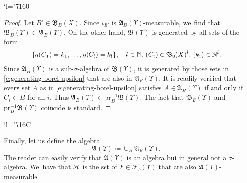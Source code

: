 \documentclass[JEP,XML,SOM,Unicode,published]{cedram}
\newcommand{\Changel}{\mathcode`l="7160}
\newcommand{\Changelback}{\mathcode`l="716C}
\theoremstyle{definition}
\theoremstyle{remark}
\DeclarePairedDelimiter{\set}{\lbrace}{\rbrace}
\begin{document}
\Changel
\begin{proof}
Let $B' \in \mathfrak{B}_{B}(X)$.
Since $\iota_{B'}$ is $\mathfrak{A}_{B}(\varUpsilon)$-measurable, we~find that $\mathfrak{B}_{B}(\varUpsilon) \subset \mathfrak{A}_{B}(\varUpsilon)$.
On the other hand, $\mathfrak{B}(\varUpsilon)$ is generated by all sets of the form
\begin{equation}\label{e:generating-borel-upsilon}
\set{ \eta(C_{1}) = k_{1}, \dotsc, \eta(C_{l}) = k_{l} }, \quad l \in \mathbb{N},\, (C_{i}) \in \mathfrak{B}_{0}(X)^{l},\, (k_{i}) \in \mathbb{N}^{l}.
\end{equation}
Since $\mathfrak{A}_{B}(\varUpsilon)$ is a sub-$\sigma$-algebra of $\mathfrak{B}(\varUpsilon)$, it is generated by those sets in \cref{e:generating-borel-upsilon} that are also in $\mathfrak{A}_{B}(\varUpsilon)$.
It is readily verified that every set $A$ as in \cref{e:generating-borel-upsilon} satisfies $A \in \mathfrak{A}_{B}(\varUpsilon)$ if and only if $C_{i} \subset B$ for all $i$.
Thus $\mathfrak{A}_{B}(\varUpsilon) \subset \mathrm{pr}_{B}^{-1} \mathfrak{B}(\varUpsilon)$.
The fact that $\mathfrak{B}_{B}(\varUpsilon)$ and $\mathrm{pr}_{B}^{-1} \mathfrak{B}(\varUpsilon)$ coincide is standard.
\end{proof}
\Changelback

Finally, let us define the algebra
\begin{equation*}
\mathfrak{A}(\varUpsilon) \coloneq \cup_{B} \mathfrak{A}_{B}(\varUpsilon).
\end{equation*}
The reader can easily verify that $\mathfrak{A}(\varUpsilon)$ is an algebra but in general not a $\sigma$-algebra. We~have that $\mathscr{H}$ is the set of $F \in \mathscr{F}_{b}(\varUpsilon)$ that are also $\mathfrak{A}(\varUpsilon)$-measurable.
\end{document}
